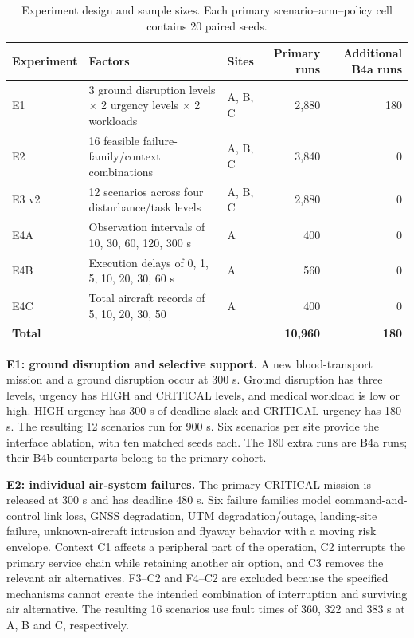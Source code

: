 \documentclass[]{interact}
\theoremstyle{plain}
\theoremstyle{definition}
\theoremstyle{remark}
\begin{document}
\begin{table}[!htbp]
\centering
\small
\setlength{\tabcolsep}{3pt}
\caption{Experiment design and sample sizes. Each primary scenario--arm--policy cell contains 20 paired seeds.}
\label{tab:table4}
\begin{tabularx}{\textwidth}{@{}YYYrr@{}}
\toprule
Experiment & Factors & Sites & Primary runs & Additional B4a runs \\
\midrule
E1 & 3 ground disruption levels $\times$ 2 urgency levels $\times$ 2 workloads & A, B, C & 2,880 & 180 \\
E2 & 16 feasible failure-family/context combinations & A, B, C & 3,840 & 0 \\
E3 v2 & 12 scenarios across four disturbance/task levels & A, B, C & 2,880 & 0 \\
E4A & Observation intervals of 10, 30, 60, 120, 300 s & A & 400 & 0 \\
E4B & Execution delays of 0, 1, 5, 10, 20, 30, 60 s & A & 560 & 0 \\
E4C & Total aircraft records of 5, 10, 20, 30, 50 & A & 400 & 0 \\
\textbf{Total} &  &  & \textbf{10,960} & \textbf{180} \\
\bottomrule
\end{tabularx}
\end{table}

\textbf{E1: ground disruption and selective support.} A new blood-transport mission and a ground disruption occur at 300 s. Ground disruption has three levels, urgency has HIGH and CRITICAL levels, and medical workload is low or high. HIGH urgency has 300 s of deadline slack and CRITICAL urgency has 180 s. The resulting 12 scenarios run for 900 s. Six scenarios per site provide the interface ablation, with ten matched seeds each. The 180 extra runs are B4a runs; their B4b counterparts belong to the primary cohort.

\textbf{E2: individual air-system failures.} The primary CRITICAL mission is released at 300 s and has deadline 480 s. Six failure families model command-and-control link loss, GNSS degradation, UTM degradation/outage, landing-site failure, unknown-aircraft intrusion and flyaway behavior with a moving risk envelope. Context C1 affects a peripheral part of the operation, C2 interrupts the primary service chain while retaining another air option, and C3 removes the relevant air alternatives. F3--C2 and F4--C2 are excluded because the specified mechanisms cannot create the intended combination of interruption and surviving air alternative. The resulting 16 scenarios use fault times of 360, 322 and 383 s at A, B and C, respectively.
\end{document}
